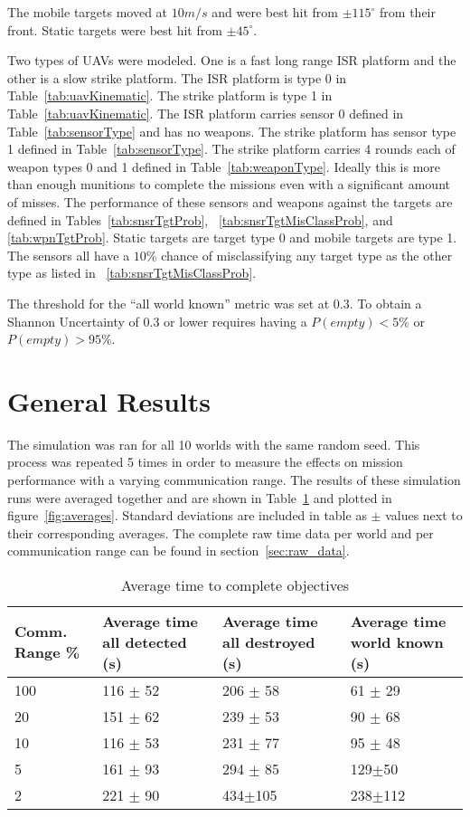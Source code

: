 The mobile targets moved at $10m/s$ and were best hit from $\pm115^{\circ}$ from their front.  Static targets were best hit from $\pm45^{\circ}$.

Two types of UAVs were modeled.  One is a fast long range ISR platform and the other is a slow strike platform.  The ISR platform is type 0 in Table~\ref{tab:uavKinematic}.  The strike platform is type 1 in Table~\ref{tab:uavKinematic}.  The ISR platform carries sensor 0 defined in Table~\ref{tab:sensorType} and has no weapons.  The strike platform has sensor type 1 defined in Table~\ref{tab:sensorType}.  The strike platform carries 4 rounds each of weapon types 0 and 1 defined in Table~\ref{tab:weaponType}.  Ideally this is more than enough munitions to complete the missions even with a significant amount of misses.  The performance of these sensors and weapons against the targets are defined in Tables~\ref{tab:snsrTgtProb}, ~\ref{tab:snsrTgtMisClassProb}, and \ref{tab:wpnTgtProb}.  Static targets are target type 0 and mobile targets are type 1.  The sensors all have a $10\%$ chance of misclassifying any target type as the other type as listed in ~\ref{tab:snsrTgtMisClassProb}.

The threshold for the ``all world known'' metric was set at 0.3. To obtain a Shannon Uncertainty of 0.3 or lower requires having a $P(empty) < 5\%$ or $P(empty) > 95\%$.

\section{General Results}

The simulation was ran for all 10 worlds with the same random seed.  This process was repeated 5 times in order to measure the effects on mission performance with a varying communication range.  The results of these simulation runs were averaged together and are shown in Table~\ref{tab:avgResults} and plotted in figure~\ref{fig:averages}.  Standard deviations are included in table as $\pm$ values next to their corresponding averages.  The complete raw time data per world and per communication range can be found in section~\ref{sec:raw_data}.


\begin{table}[H]
	\caption{Average time to complete objectives}
	\centering
	\label{tab:avgResults}
	\begin{tabular}{|p{1.1cm}|p{1.75cm}|p{1.75cm}|p{1.5cm}|}
		\hline
		Comm. Range \% & Average time all detected (s) & Average time all destroyed (s) & Average time world known (s)\\
		\hline
		100 & 116 $\pm$ 52 & 206 $\pm$ 58  & 61 $\pm$ 29  \\ \hline
		20  & 151 $\pm$ 62 & 239 $\pm$ 53  & 90 $\pm$ 68  \\ \hline
		10  & 116 $\pm$ 53 & 231 $\pm$ 77  & 95 $\pm$ 48  \\ \hline
		5   & 161 $\pm$ 93 & 294 $\pm$ 85  & 129$\pm$50 \\ \hline
		2   & 221 $\pm$ 90 & 434$\pm$105 & 238$\pm$112 \\ \hline
	\end{tabular}
\end{table}



